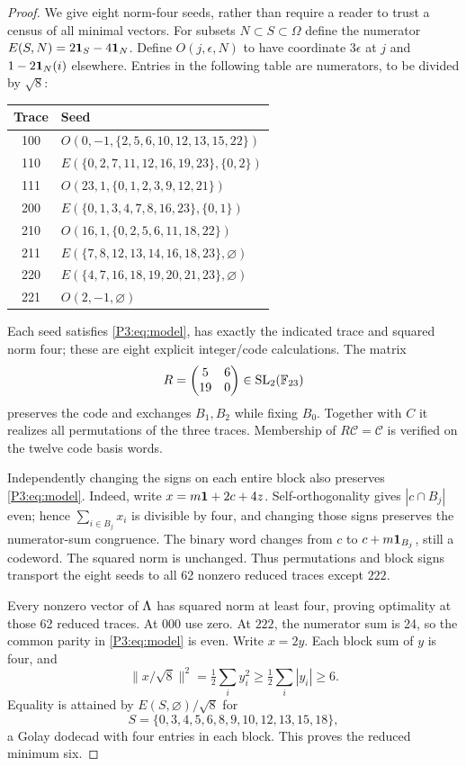 \begin{proof}
We give eight norm-four seeds, rather than require a reader to trust a census of all minimal vectors. For subsets $N\subset S\subset\Omega$ define the numerator
$E(S,N)=2\mathbf1_S-4\mathbf1_N$. Define $O(j,\epsilon,N)$ to have coordinate $3\epsilon$ at $j$ and $1-2\mathbf1_N(i)$ elsewhere. Entries in the following table are numerators, to be divided by $\sqrt8$:
\begin{center}\small
\begin{tabular}{cl}
\toprule
Trace&Seed\\\midrule
100&$O(0,-1,\{2,5,6,10,12,13,15,22\})$\\
110&$E(\{0,2,7,11,12,16,19,23\},\{0,2\})$\\
111&$O(23,1,\{0,1,2,3,9,12,21\})$\\
200&$E(\{0,1,3,4,7,8,16,23\},\{0,1\})$\\
210&$O(16,1,\{0,2,5,6,11,18,22\})$\\
211&$E(\{7,8,12,13,14,16,18,23\},\varnothing)$\\
220&$E(\{4,7,16,18,19,20,21,23\},\varnothing)$\\
221&$O(2,-1,\varnothing)$\\\bottomrule
\end{tabular}
\end{center}
Each seed satisfies \eqref{P3:eq:model}, has exactly the indicated trace and squared norm four; these are eight explicit integer/code calculations. The matrix
\[
R=\begin{pmatrix}5&6\\19&0\end{pmatrix}\in\operatorname{SL}_2(\mathbb F_{23})
\]
preserves the code and exchanges $B_1,B_2$ while fixing $B_0$. Together with $C$ it realizes all permutations of the three traces. Membership of $R\mathcal C=\mathcal C$ is verified on the twelve code basis words.

Independently changing the signs on each entire block also preserves \eqref{P3:eq:model}. Indeed, write $x=m\mathbf1+2c+4z$. Self-orthogonality gives $|c\cap B_j|$ even; hence $\sum_{i\in B_j}x_i$ is divisible by four, and changing those signs preserves the numerator-sum congruence. The binary word changes from $c$ to $c+m\mathbf1_{B_j}$, still a codeword. The squared norm is unchanged. Thus permutations and block signs transport the eight seeds to all 62 nonzero reduced traces except $222$.

Every nonzero vector of $\Lambda$ has squared norm at least four, proving optimality at those 62 reduced traces. At $000$ use zero. At $222$, the numerator sum is 24, so the common parity in \eqref{P3:eq:model} is even. Write $x=2y$. Each block sum of $y$ is four, and
\[
\|x/\sqrt8\|^2=\tfrac12\sum_i y_i^2
\ge\tfrac12\sum_i|y_i|\ge6.
\]
Equality is attained by $E(S,\varnothing)/\sqrt8$ for
\[
S=\{0,3,4,5,6,8,9,10,12,13,15,18\},
\]
a Golay dodecad with four entries in each block. This proves the reduced minimum six.


\end{proof}

